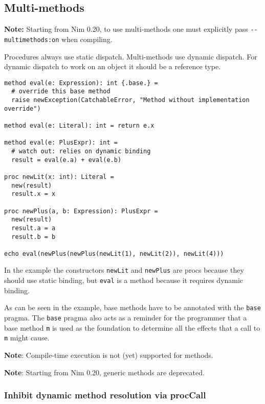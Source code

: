 \hypertarget{multi-methods}{%
\subsection{Multi-methods}\label{multi-methods}}

\textbf{Note:} Starting from Nim 0.20, to use multi-methods one must
explicitly pass \texttt{-\/-multimethods:on} when compiling.

Procedures always use static dispatch. Multi-methods use dynamic
dispatch. For dynamic dispatch to work on an object it should be a
reference type.

\begin{verbatim}
method eval(e: Expression): int {.base.} =
  # override this base method
  raise newException(CatchableError, "Method without implementation override")

method eval(e: Literal): int = return e.x

method eval(e: PlusExpr): int =
  # watch out: relies on dynamic binding
  result = eval(e.a) + eval(e.b)

proc newLit(x: int): Literal =
  new(result)
  result.x = x

proc newPlus(a, b: Expression): PlusExpr =
  new(result)
  result.a = a
  result.b = b

echo eval(newPlus(newPlus(newLit(1), newLit(2)), newLit(4)))
\end{verbatim}

In the example the constructors \texttt{newLit} and \texttt{newPlus} are
procs because they should use static binding, but \texttt{eval} is a
method because it requires dynamic binding.

As can be seen in the example, base methods have to be annotated with
the \texttt{base} pragma. The \texttt{base} pragma also acts as a
reminder for the programmer that a base method \texttt{m} is used as the
foundation to determine all the effects that a call to \texttt{m} might
cause.

\textbf{Note}: Compile-time execution is not (yet) supported for
methods.

\textbf{Note}: Starting from Nim 0.20, generic methods are deprecated.

\hypertarget{inhibit-dynamic-method-resolution-via-proccall}{%
\subsubsection{Inhibit dynamic method resolution via
procCall}\label{inhibit-dynamic-method-resolution-via-proccall}}


